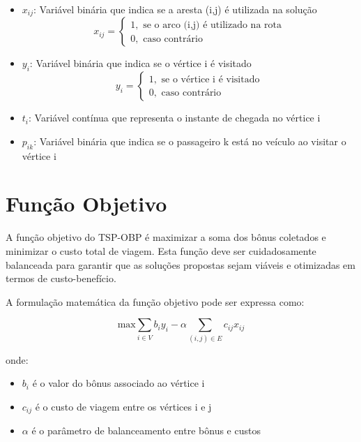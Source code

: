\documentclass[12pt, a4paper]{report}
\begin{document}
\begin{itemize}
    \item $x_{ij}$: Variável binária que indica se a aresta (i,j) é utilizada na solução
    \begin{equation}
        x_{ij} = \begin{cases}
            1, \text{ se o arco (i,j) é utilizado na rota} \\
            0, \text{ caso contrário}
        \end{cases}
    \end{equation}

    \item $y_i$: Variável binária que indica se o vértice i é visitado
    \begin{equation}
        y_i = \begin{cases}
            1, \text{ se o vértice i é visitado} \\
            0, \text{ caso contrário}
        \end{cases}
    \end{equation}

    \item $t_i$: Variável contínua que representa o instante de chegada no vértice i

    \item $p_{ik}$: Variável binária que indica se o passageiro k está no veículo ao visitar o vértice i
\end{itemize}

\section{Função Objetivo}
A função objetivo do TSP-OBP é maximizar a soma dos bônus coletados e minimizar o custo total de viagem. Esta função deve ser cuidadosamente balanceada para garantir que as soluções propostas sejam viáveis e otimizadas em termos de custo-benefício.

A formulação matemática da função objetivo pode ser expressa como:

\begin{equation}
    \text{max} \sum_{i \in V} b_i y_i - \alpha \sum_{(i,j) \in E} c_{ij} x_{ij}
\end{equation}

onde:
\begin{itemize}
    \item $b_i$ é o valor do bônus associado ao vértice i
    \item $c_{ij}$ é o custo de viagem entre os vértices i e j
    \item $\alpha$ é o parâmetro de balanceamento entre bônus e custos
\end{itemize}
\end{document}
